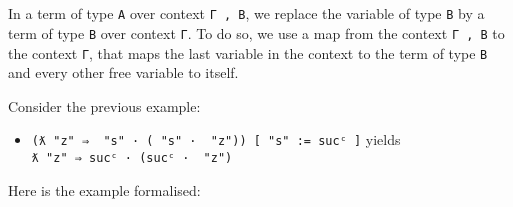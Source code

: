 \begin{fence}
\begin{code}
\AgdaSymbol{:}\AgdaSpace{}%
\AgdaSpace{}%
\AgdaSymbol{\{}\AgdaSymbol{\}}\AgdaSpace{}%
\AgdaSpace{}%
\AgdaSpace{}%
\AgdaOperator{\AgdaInductiveConstructor{,}}\AgdaSpace{}%
\AgdaSpace{}%
\AgdaSpace{}%
\AgdaSpace{}%
\AgdaSpace{}%
\AgdaSpace{}%
\AgdaSpace{}%
\<%
\\
%
\>[2]\AgdaSpace{}%
%
\>[11]\AgdaSymbol{=}%
\>[14]\<%
\\
%
\>[2]\AgdaSpace{}%
\AgdaSymbol{(}\AgdaSpace{}%
\AgdaSymbol{)}%
\>[11]\AgdaSymbol{=}%
\>[14]\AgdaSpace{}%
\<%
\end{code}
\end{fence}

In a term of type \texttt{A} over context \texttt{Γ\ ,\ B}, we replace
the variable of type \texttt{B} by a term of type \texttt{B} over
context \texttt{Γ}. To do so, we use a map from the context
\texttt{Γ\ ,\ B} to the context \texttt{Γ}, that maps the last variable
in the context to the term of type \texttt{B} and every other free
variable to itself.

Consider the previous example:

\begin{itemize}
\tightlist
\item
  \texttt{(ƛ\ "z"\ ⇒\ \textasciigrave{}\ "s"\ ·\ (\textasciigrave{}\ "s"\ ·\ \textasciigrave{}\ "z"))\ {[}\ "s"\ :=\ sucᶜ\ {]}}
  yields \texttt{ƛ\ "z"\ ⇒\ sucᶜ\ ·\ (sucᶜ\ ·\ \textasciigrave{}\ "z")}
\end{itemize}

Here is the example formalised:

